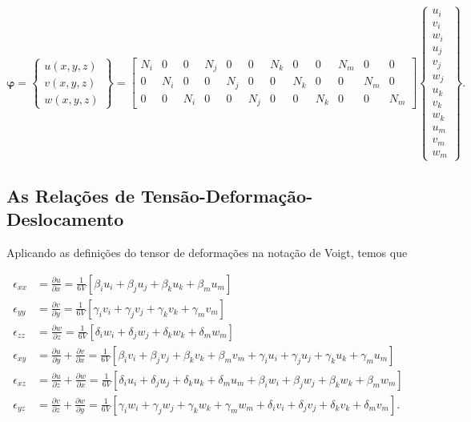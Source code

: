\begin{equation}
    \bm{\varphi} = \begin{Bmatrix}
        u(x,y,z) \\
        v(x,y,z) \\
        w(x,y,z)
    \end{Bmatrix} = \begin{bmatrix}
        N_i & 0 & 0 & N_j & 0 & 0 & N_k & 0 & 0 & N_m & 0 & 0 \\
        0 & N_i & 0 & 0 & N_j & 0 & 0 & N_k & 0 & 0 & N_m & 0 \\
        0 & 0 & N_i & 0 & 0 & N_j & 0 & 0 & N_k & 0 & 0 & N_m
    \end{bmatrix}
    \begin{Bmatrix}
        u_i \\ v_i \\ w_i \\ u_j \\ v_j \\ w_j \\ u_k \\ v_k \\ w_k \\ u_m \\ v_m \\ w_m
    \end{Bmatrix}.
\end{equation}

\subsection{As Relações de Tensão-Deformação-Deslocamento}

Aplicando as definições do tensor de deformações na notação de Voigt, temos que

\begin{align}
    \epsilon_{xx} &= \frac{\partial u}{\partial x} = \frac{1}{6V}[\beta_i u_i + \beta_j u_j + \beta_k u_k + \beta_m u_m] \\
    \epsilon_{yy} &= \frac{\partial v}{\partial y} = \frac{1}{6V}[\gamma_i v_i + \gamma_j v_j + \gamma_k v_k + \gamma_m v_m] \\
    \epsilon_{zz} &= \frac{\partial w}{\partial z} = \frac{1}{6V}[\delta_i w_i + \delta_j w_j + \delta_k w_k + \delta_m w_m] \\
    \epsilon_{xy} &= \frac{\partial u}{\partial y} + \frac{\partial v}{\partial x} = \frac{1}{6V}[\beta_i v_i + \beta_j v_j + \beta_k v_k + \beta_m v_m + \gamma_i u_i + \gamma_j u_j + \gamma_k u_k + \gamma_m u_m] \\
    \epsilon_{xz} &= \frac{\partial u}{\partial z} + \frac{\partial w}{\partial x} = \frac{1}{6V}[\delta_i u_i + \delta_j u_j + \delta_k u_k + \delta_m u_m + \beta_i w_i + \beta_j w_j + \beta_k w_k + \beta_m w_m] \\
    \epsilon_{yz} &= \frac{\partial v}{\partial z} + \frac{\partial w}{\partial y} = \frac{1}{6V}[\gamma_i w_i + \gamma_j w_j + \gamma_k w_k + \gamma_m w_m + \delta_i v_i + \delta_j v_j + \delta_k v_k + \delta_m v_m].
\end{align}

